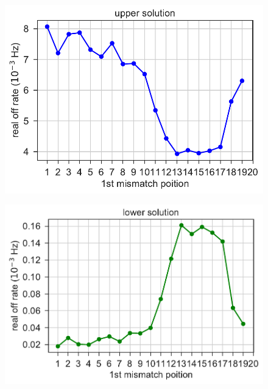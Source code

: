 \documentclass[a4paper,twoside]{revtex4-1}
\begin{document}
\begin{figure}[H]
\includegraphics[scale=0.5]{fig9_10_10_2018.pdf}
\end{figure}
\begin{figure}[H]
\includegraphics[scale=0.5]{fig10_10_10_2018.pdf}
\end{figure}
\end{document}
